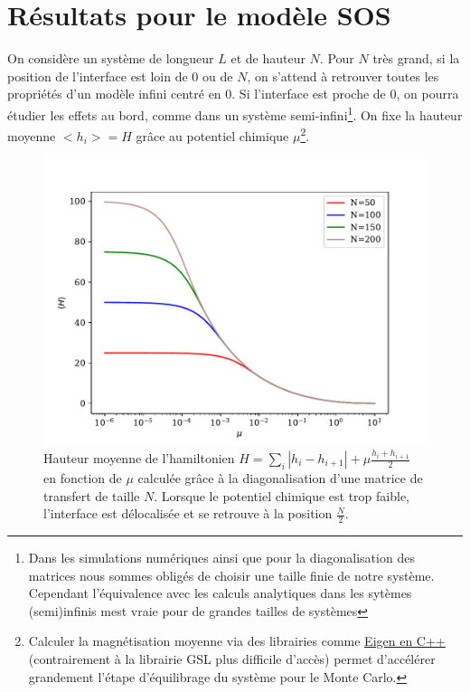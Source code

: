 \chapter{Résultats pour le modèle SOS}

On considère un système de longueur $L$ et de hauteur $N$. Pour $N$ très grand, si la position de l'interface est loin de $0$ ou de $N$, on s'attend à retrouver toutes les propriétés d'un modèle infini centré en 0. Si l'interface est proche de $0$, on pourra étudier les effets au bord, comme dans un système semi-infini\footnote{Dans les simulations numériques ainsi que pour la diagonalisation des matrices nous sommes obligés de choisir une taille finie de notre système. Cependant l'équivalence avec les calculs analytiques dans les sytèmes (semi)infinis mest vraie pour de grandes tailles de systèmes}.  On fixe la hauteur moyenne $<h_i> = H$ grâce au potentiel chimique $\mu$\footnote{Calculer la magnétisation moyenne via des librairies comme \hyperlink{http://eigen.tuxfamily.org/index.php?title=Main_Page}{\underline{Eigen en C++}} (contrairement à la librairie GSL plus difficile d'accès) permet d'accélérer grandement l'étape d'équilibrage du système pour le Monte Carlo.}.

\begin{figure}[h]
	\includegraphics[width=\linewidth]{semiifgeom/hauteur-mu.pdf}
	\caption{Hauteur moyenne de l'hamiltonien $H = \sum_i |h_i-h_{i+1}| + \mu \frac{h_i+h_{i+1}}{2}$ en fonction de $\mu$ calculée grâce à la diagonalisation d'une matrice de transfert de taille $N$. Lorsque le potentiel chimique est trop faible, l'interface est délocalisée et se retrouve à la position $\frac{N}{2}$. }
	\label{hauteur-mu}
\end{figure}

